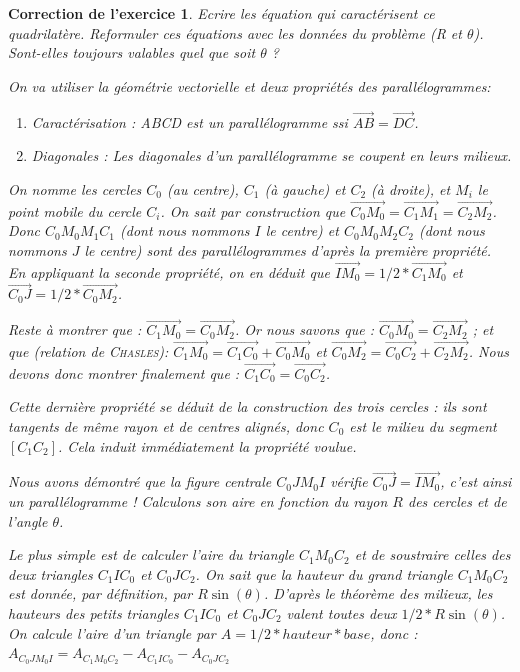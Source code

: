 \documentclass[12pt]{article}
\theoremstyle{break}
\newtheorem{cor}{Correction de l'exercice}
\begin{document}
\begin{cor}
\textit{Ecrire les équation qui caractérisent ce quadrilatère. Reformuler ces équations avec les données du problème (R et $\theta$). Sont-elles toujours valables quel que soit $\theta$ ? }

On va utiliser la géométrie vectorielle et deux propriétés des parallélogrammes:\begin{enumerate}
\item \textit{Caractérisation} : ABCD est un parallélogramme ssi $\overrightarrow{AB} = \overrightarrow{DC}$.
\item \textit{Diagonales} : Les diagonales d'un parallélogramme se coupent en leurs milieux.
\end{enumerate}

On nomme les cercles $C_0$ (au centre), $C_1$ (à gauche) et $C_2$ (à droite), et $M_i$ le point mobile du cercle $C_i$. On sait par construction que $\overrightarrow{C_0 M_0} = \overrightarrow{C_1 M_1} = \overrightarrow{C_2 M_2}$. Donc $C_0 M_0 M_1 C_1$ (dont nous nommons $I$ le centre) et $C_0 M_0 M_2 C_2$ (dont nous nommons $J$ le centre) sont des parallélogrammes d'après la première propriété. En appliquant la seconde propriété, on en déduit que $\overrightarrow{I M_0} = 1/2 * \overrightarrow{C_1 M_0}$ et $\overrightarrow{C_0 J} = 1/2 * \overrightarrow{C_0 M_2}$.

Reste à montrer que : $\overrightarrow{C_1 M_0} = \overrightarrow{C_0 M_2}$. Or nous savons que : $\overrightarrow{C_0 M_0} = \overrightarrow{C_2 M_2}$ ; et que (relation de \textsc{Chasles}): $\overrightarrow{C_1 M_0} = \overrightarrow{C_1 C_0} + \overrightarrow{C_0 M_0}$ et $\overrightarrow{C_0 M_2} = \overrightarrow{C_0 C_2} + \overrightarrow{C_2 M_2}$. Nous devons donc montrer finalement que : $\overrightarrow{C_1 C_0} = \overrightarrow{C_0 C_2}$.

Cette dernière propriété se déduit de la construction des trois cercles : ils sont tangents de même rayon et de centres alignés, donc $C_0$ est le milieu du segment $[C_1 C_2]$. Cela induit immédiatement la propriété voulue.

Nous avons démontré que la figure centrale $C_0 J M_0 I$ vérifie $\overrightarrow{C_0 J} = \overrightarrow{I M_0}$, c'est ainsi un parallélogramme ! Calculons son aire en fonction du rayon $R$ des cercles et de l'angle $\theta$.

Le plus simple est de calculer l'aire du triangle $C_1 M_0 C_2$ et de soustraire celles des deux triangles $C_1 I C_0$ et $C_0 J C_2$. On sait que la hauteur du grand triangle $C_1 M_0 C_2$ est donnée, par définition, par $R \sin(\theta)$. D'après le théorème des milieux, les hauteurs des petits triangles $C_1 I C_0$ et $C_0 J C_2$ valent toutes deux $1/2 * R \sin(\theta)$. On calcule l'aire d'un triangle par $A = 1/2 * hauteur * base$, donc :
$A_{C_0 J M_0 I} = A_{C_1 M_0 C_2} - A_{C_1 I C_0} - A_{C_0 J C_2}$


\end{cor}
\end{document}
